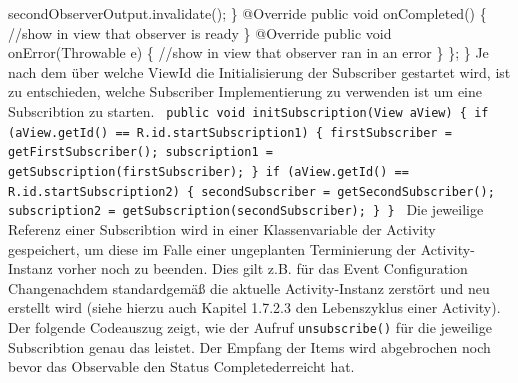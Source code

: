 \documentclass[12pt,oneside,a4paper,bibtotoc,liststotoc]{scrreprt}
\begin{document}
{\newline
               secondObserverOutput.invalidate();\newline
           \}\newline
\newline
           @Override\newline
           public void onCompleted() \{\newline
               //show in view that observer is ready\newline
           \}\newline
\newline
           @Override\newline
           public void onError(Throwable e) \{\newline
               //show in view that observer ran in an error\newline
           \}\newline
       \};\newline
   \}\newline
   }\newline
Je nach dem über welche ViewId die Initialisierung der Subscriber gestartet wird, ist zu entschieden, welche Subscriber Implementierung zu verwenden ist um eine Subscribtion zu starten.\newline
\texttt{\newline
 public void initSubscription(View aView) \{\newline
       if (aView.getId() == R.id.startSubscription1) \{\newline
           firstSubscriber = getFirstSubscriber();\newline
           subscription1 = getSubscription(firstSubscriber);\newline
\newline
       \}\newline
       if (aView.getId() == R.id.startSubscription2) \{\newline
           secondSubscriber = getSecondSubscriber();\newline
\newline
           subscription2 = getSubscription(secondSubscriber);\newline
       \}\newline
   \}\newline
}\newline
Die jeweilige Referenz einer Subscribtion wird in einer Klassenvariable der Activity gespeichert, um diese im Falle einer ungeplanten Terminierung der Activity-Instanz vorher noch zu beenden. Dies gilt z.B. für das Event \grqq Configuration Change\grqq nachdem standardgemäß die aktuelle Activity-Instanz zerstört und neu erstellt wird (siehe hierzu auch Kapitel 1.7.2.3 den Lebenszyklus einer Activity). Der folgende Codeauszug zeigt, wie der Aufruf \texttt{unsubscribe()} für die jeweilige Subscribtion genau das leistet. Der Empfang der Items wird abgebrochen noch bevor das Observable den Status \grqq Completed\grqq erreicht hat.\newline
\end{document}
